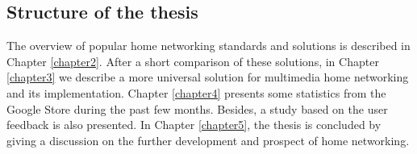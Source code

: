 \subsection{Structure of the thesis}
The overview of popular home networking standards and solutions is described in
Chapter \ref{chapter2}. After a short comparison of these solutions, in Chapter \ref{chapter3} we
describe a more universal solution for multimedia home networking and its
implementation. Chapter \ref{chapter4} presents some statistics from the Google Store
during the past few months. Besides, a study based on the user feedback is also presented. In Chapter \ref{chapter5}, the thesis is concluded by giving a discussion on the further development and prospect of home networking.